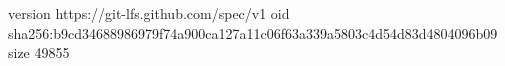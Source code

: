 version https://git-lfs.github.com/spec/v1
oid sha256:b9cd34688986979f74a900ca127a11c06f63a339a5803c4d54d83d4804096b09
size 49855
